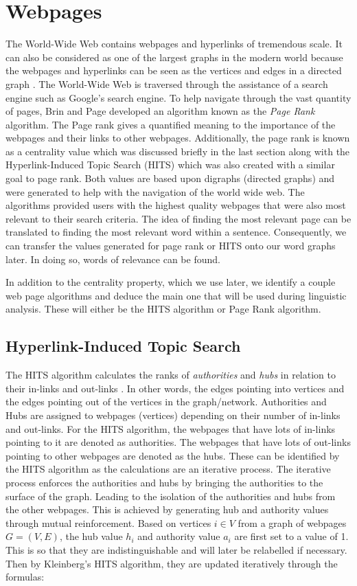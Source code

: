 \section{Webpages}
The World-Wide Web contains webpages and hyperlinks of tremendous scale. It can also be considered as one of the largest graphs in the modern world because the webpages and hyperlinks can be seen as the vertices and edges in a directed graph \cite{kumar2000web}. The World-Wide Web is traversed through the assistance of a search engine such as Google's search engine. To help navigate through the vast quantity of pages, Brin and Page \cite{brin1998anatomy} developed an algorithm known as the \emph{Page Rank} algorithm. The Page rank gives a quantified meaning to the importance of the webpages and their links to other webpages. Additionally, the page rank is known as a centrality value which was discussed briefly in the last section along with the Hyperlink-Induced Topic Search (HITS) which was also created with a similar goal to page rank. Both values are based upon digraphs (directed graphs) and were generated to help with the navigation of the world wide web. The algorithms provided users with the highest quality webpages that were also most relevant to their search criteria. The idea of finding the most relevant page can be translated to finding the most relevant word within a sentence. Consequently, we can transfer the values generated for page rank or HITS onto our word graphs later. In doing so, words of relevance can be found.

In addition to the centrality property, which we use later, we identify a couple web page algorithms and deduce the main one that will be used during linguistic analysis. These will either be the HITS algorithm or Page Rank algorithm.

\subsection{Hyperlink-Induced Topic Search}
The HITS algorithm calculates the ranks of \emph{authorities} and \emph{hubs} in relation to their in-links and out-links \cite{langville2005survey}. In other words, the edges pointing into vertices and the edges pointing out of the vertices in the graph/network. Authorities and Hubs are assigned to webpages (vertices) depending on their number of in-links and out-links. For the HITS algorithm, the webpages that have lots of in-links pointing to it are denoted as authorities. The webpages that have lots of out-links pointing to other webpages are denoted as the hubs. These can be identified by the HITS algorithm as the calculations are an iterative process. The iterative process enforces the authorities and hubs by bringing the authorities to the surface of the graph. Leading to the isolation of the authorities and hubs from the other webpages. This is achieved by generating hub and authority values through mutual reinforcement. Based on vertices $i \in V$ from a graph of webpages $G = (V , E)$, the hub value $h_i$ and authority value $a_i$ are first set to a value of 1. This is so that they are indistinguishable and will later be relabelled if necessary. Then by Kleinberg's HITS algorithm, they are updated iteratively through the formulas:

